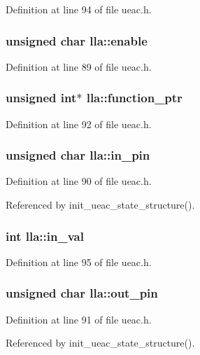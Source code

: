 Definition at line 94 of file ueac.h.
\subsubsection{\setlength{\rightskip}{0pt plus 5cm}unsigned char {\bf lla::enable}}\label{structlla_o0}




Definition at line 89 of file ueac.h.
\subsubsection{\setlength{\rightskip}{0pt plus 5cm}unsigned int$\ast$ {\bf lla::function\_\-ptr}}\label{structlla_o3}




Definition at line 92 of file ueac.h.
\subsubsection{\setlength{\rightskip}{0pt plus 5cm}unsigned char {\bf lla::in\_\-pin}}\label{structlla_o1}




Definition at line 90 of file ueac.h.

Referenced by init\_\-ueac\_\-state\_\-structure().
\subsubsection{\setlength{\rightskip}{0pt plus 5cm}int {\bf lla::in\_\-val}}\label{structlla_o6}




Definition at line 95 of file ueac.h.
\subsubsection{\setlength{\rightskip}{0pt plus 5cm}unsigned char {\bf lla::out\_\-pin}}\label{structlla_o2}




Definition at line 91 of file ueac.h.

Referenced by init\_\-ueac\_\-state\_\-structure().
